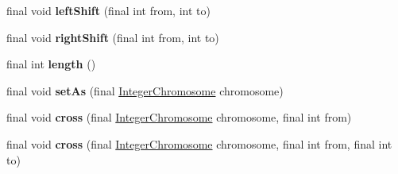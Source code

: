 \begin{DoxyCompactItemize}
\item 
\hypertarget{classjenes_1_1chromosome_1_1_integer_chromosome_a8a05522811de03e5ea9fff08385ac306}{final void {\bfseries left\-Shift} (final int from, int to)}\label{classjenes_1_1chromosome_1_1_integer_chromosome_a8a05522811de03e5ea9fff08385ac306}

\item 
\hypertarget{classjenes_1_1chromosome_1_1_integer_chromosome_a361afe717a58a8b47316e62178b387f5}{final void {\bfseries right\-Shift} (final int from, int to)}\label{classjenes_1_1chromosome_1_1_integer_chromosome_a361afe717a58a8b47316e62178b387f5}

\item 
\hypertarget{classjenes_1_1chromosome_1_1_integer_chromosome_a8e44ab8d05b2632e72c209c641f10073}{final int {\bfseries length} ()}\label{classjenes_1_1chromosome_1_1_integer_chromosome_a8e44ab8d05b2632e72c209c641f10073}

\item 
\hypertarget{classjenes_1_1chromosome_1_1_integer_chromosome_a65b39a2a6ef3deb1cb107b7f474bcbb0}{final void {\bfseries set\-As} (final \hyperlink{classjenes_1_1chromosome_1_1_integer_chromosome}{Integer\-Chromosome} chromosome)}\label{classjenes_1_1chromosome_1_1_integer_chromosome_a65b39a2a6ef3deb1cb107b7f474bcbb0}

\item 
\hypertarget{classjenes_1_1chromosome_1_1_integer_chromosome_a36acf5fbdfbb8a2718ade474188248d4}{final void {\bfseries cross} (final \hyperlink{classjenes_1_1chromosome_1_1_integer_chromosome}{Integer\-Chromosome} chromosome, final int from)}\label{classjenes_1_1chromosome_1_1_integer_chromosome_a36acf5fbdfbb8a2718ade474188248d4}

\item 
\hypertarget{classjenes_1_1chromosome_1_1_integer_chromosome_adfb0865b40586caf2d78a7d2d58c7796}{final void {\bfseries cross} (final \hyperlink{classjenes_1_1chromosome_1_1_integer_chromosome}{Integer\-Chromosome} chromosome, final int from, final int to)}\label{classjenes_1_1chromosome_1_1_integer_chromosome_adfb0865b40586caf2d78a7d2d58c7796}


\end{DoxyCompactItemize}
